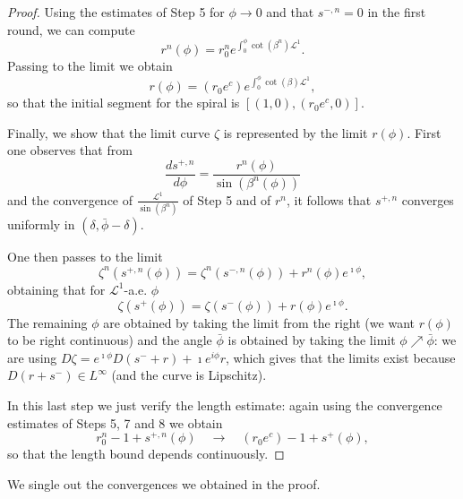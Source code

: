 \documentclass[reqno]{amsart}
\theoremstyle{definition} \newtheorem{definition}{Definition}[section]
\theoremstyle{definition} \newtheorem{remark}[definition]{Remark}
\theoremstyle{plain} \newtheorem{lemma}[definition]{Lemma}
\theoremstyle{plain} \newtheorem{proposition}[definition]{Proposition}
\theoremstyle{plain} \newtheorem{theorem}[definition]{Theorem}
\theoremstyle{plain} \newtheorem{corollary}[definition]{Corollary}
\theoremstyle{definition} \newtheorem{example}[definition]{Example}
\theoremstyle{plain} \newtheorem{claim}[clai]{Claim}
\theoremstyle{definition} \newtheorem{assumption}[definition]{Assumption}
\theoremstyle{definition} \newtheorem{observation}[definition]{Observation}
\newcommand{\1}{\mathbbm 1}
\renewcommand{\i}{\imath}
\numberwithin{equation}{section} %
\theoremstyle{plain} \newtheorem*{theorem*}{Theorem}
\theoremstyle{plain} \newtheorem{mthm}[maintheorem]{Main Theorem}
\theoremstyle{plain} \newtheorem*{mthm*}{Main Theorem}
\theoremstyle{plain} \newtheorem*{conjecture*}{Conjecture}
\theoremstyle{plain} \newtheorem{conjecture}[definition]{Conjecture}
\theoremstyle{plain} \newtheorem*{problem*}{Problem}
\begin{document}
\begin{proof}
Using the estimates of Step 5 for $\phi \to 0$ and that $s^{-,n} = 0$ in the first round, we can compute
\begin{equation*}
r^n(\phi) = r^n_0 e^{\int_0^\phi \cot(\beta^n) \mathscr L^1}.
\end{equation*}
Passing to the limit we obtain
\begin{equation*}
r(\phi) = (r_0 e^c) e^{\int_0^\phi \cot(\beta) \mathscr L^1},
\end{equation*}
so that the initial segment for the spiral is $[(1,0),(r_0 e^c,0)]$.

\medskip

 Finally, we show that the limit curve $\zeta$ is represented by the limit $r(\phi)$. First one observes that from
\begin{equation*}
\frac{ds^{+,n}}{d\phi} = \frac{r^n(\phi)}{\sin(\beta^n(\phi))}
\end{equation*}
and the convergence of $\frac{\mathscr L^1}{\sin(\beta^n)}$ of Step 5 and of $r^n$, it follows that $s^{+,n}$ converges uniformly in $(\delta,{\bar \phi}-\delta)$.

One then passes to the limit
\begin{equation*}
\zeta^n(s^{+,n}(\phi)) = \zeta^n(s^{-,n}(\phi)) + r^n(\phi) e^{\i \phi},
\end{equation*}
obtaining that for $\mathscr L^1$-a.e. $\phi$
\begin{equation*}
\zeta(s^{+}(\phi)) = \zeta(s^{-}(\phi)) + r(\phi) e^{\i \phi}.
\end{equation*}
The remaining $\phi$ are obtained by taking the limit from the right (we want $r(\phi)$ to be right continuous) and the angle ${\bar \phi}$ is obtained by taking the limit $\phi \nearrow {\bar \phi}$: we are using $D\zeta = e^{\i \phi} D(s^- + r) + \i e^{i\phi} r$, which gives that the limits exist because $D(r + s^-) \in L^\infty$ (and the curve is Lipschitz).

\medskip

 In this last step we just verify the length estimate: again using the convergence estimates of Steps 5, 7 and 8 we obtain
\begin{equation*}
r_0^n - 1 + s^{+,n}(\phi) \quad \to \quad (r_0 e^c) - 1 + s^+(\phi),
\end{equation*}
so that the length bound depends continuously.
\end{proof}

We single out the convergences we obtained in the proof.
\end{document}
